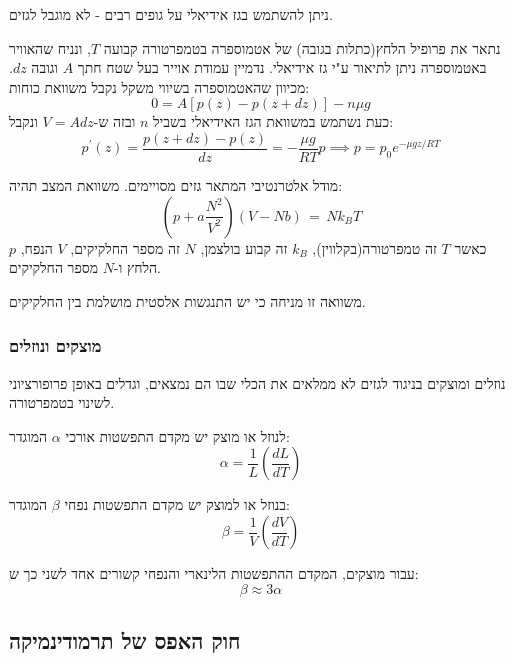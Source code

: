 \documentclass{tstextbook}
\begin{document}
ניתן להשתמש בגז אידיאלי על גופים רבים - לא מוגבל לגזים. 

\begin{example}
נתאר את פרופיל הלחץ(כתלות בגובה) של אטמוספרה בטמפרטורה קבועה \(T\), ונניח שהאוויר באטמוספרה ניתן לתיאור ע"י גז אידיאלי.
נדמיין עמודת אוייר בעל שטח חתך \(A\) וגובה \(dz\). מכיוון שהאטמוספרה בשיווי משקל נקבל משוואת כוחות:
$$0=A\left[p\left(z\right)-p\left(z+d z\right)\right]-n\mu g$$
כעת נשתמש במשוואת הגז האידיאלי בשביל \(n\) ובזה ש-\(V=Adz\) ונקבל:
$$p^{\prime}\left(z\right)=\frac{p\left(z+d z\right)-p\left(z\right)}{d z}=-\frac{\mu g}{R T}p\implies p=p_{0}e^{-\mu gz/RT}$$

\end{example}
\begin{definition}
מודל אלטרנטיבי המתאר גזים מסויימים. משוואת המצב תהיה:
$$\left(p+a\frac{N^{2}}{V^{2}}\right)\left(V-N b\right)\,=\,N k_{B}T$$
כאשר \(T\) זה טמפרטורה(בקלווין), \(k_{B}\) זה קבוע בולצמן, \(N\) זה מספר החלקיקים, \(V\) הנפח, \(p\) הלחץ ו-\(N\) מספר החלקיקים.

\end{definition}
משוואה זו מניחה כי יש התנגשות אלסטית מושלמת בין החלקיקים.

\subsubsection{מוצקים ונוזלים}

נוזלים ומוצקים בניגוד לגזים לא ממלאים את הכלי שבו הם נמצאים, וגדלים באופן פרופורציוני לשינוי בטמפרטורה.

\begin{definition}
לנוזל או מוצק יש מקדם התפשטות אורכי \(\alpha\) המוגדר:
$$\alpha\!=\!{\frac{1}{L}}\!\left({\frac{d L}{d T}}\right)$$

\end{definition}
\begin{definition}
בנוזל או למוצק יש מקדם התפשטות נפחי \(\beta\) המוגדר:
$$\beta\!=\!{\frac{1}{V}}\!\left({\frac{d V}{d T}}\right)$$

\end{definition}
\begin{proposition}
עבור מוצקים, המקדם ההתפשטות הלינארי והנפחי קשורים אחד לשני כך ש:
$${\beta}\approx 3\alpha$$

\end{proposition}
\subsection{חוק האפס של תרמודינמיקה}
\end{document}
